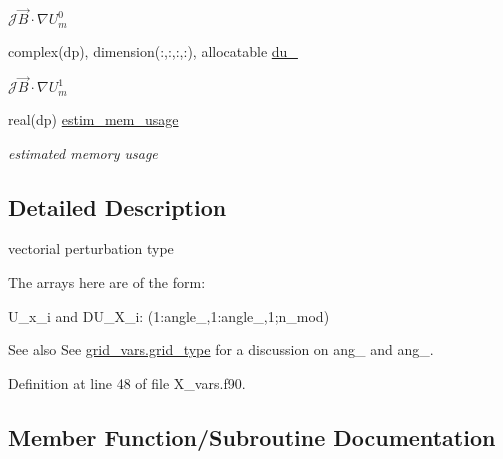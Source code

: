 \begin{DoxyCompactItemize}
\begin{DoxyCompactList}\small\item\em $\mathcal{J}\vec{B}\cdot\nabla U_m^0$ \end{DoxyCompactList}\item 
complex(dp), dimension(\+:,\+:,\+:,\+:), allocatable \hyperlink{structx__vars_1_1x__1__type_a011bea6d3bba4a1ceb5aa6cfd0f3f998}{du\+\_}
\begin{DoxyCompactList}\small\item\em $\mathcal{J}\vec{B}\cdot\nabla U_m^1$ \end{DoxyCompactList}\item 
real(dp) \hyperlink{structx__vars_1_1x__1__type_a98aaf1014e25f61014222339596db565}{estim\+\_\+mem\+\_\+usage}
\begin{DoxyCompactList}\small\item\em estimated memory usage \end{DoxyCompactList}\end{DoxyCompactItemize}


\subsection{Detailed Description}
vectorial perturbation type 

The arrays here are of the form\+:
\begin{DoxyItemize}
\item {\ttfamily U\+\_\+x\+\_\+i} and D\+U\+\_\+\+X\+\_\+i\+: {\ttfamily (1\+:angle\+\_,1\+:angle\+\_,1;n\+\_\+mod)}
\end{DoxyItemize}

\begin{DoxySeeAlso}{See also}
See \hyperlink{structgrid__vars_1_1grid__type}{grid\+\_\+vars.\+grid\+\_\+type} for a discussion on {\ttfamily ang\+\_} and {\ttfamily ang\+\_}. 
\end{DoxySeeAlso}


Definition at line 48 of file X\+\_\+vars.\+f90.



\subsection{Member Function/\+Subroutine Documentation}
\mbox{\label{structx__vars_1_1x__1__type_a8150516389a9cfe7716b0fe70ff6aeab}} 
